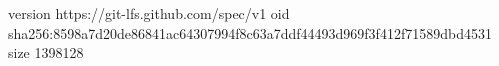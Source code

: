 version https://git-lfs.github.com/spec/v1
oid sha256:8598a7d20de86841ac64307994f8c63a7ddf44493d969f3f412f71589dbd4531
size 1398128
